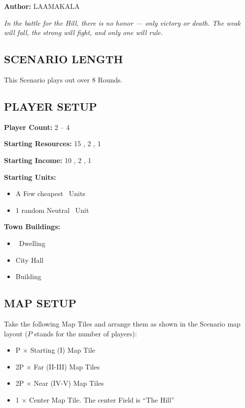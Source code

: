 
\begin{multicols*}{2}

\textbf{Author:} LAAMAKALA

\textit{In the battle for the Hill, there is no honor — only victory or death. The weak will fall, the strong will fight, and only one will rule.}

\subsection*{\MakeUppercase{Scenario Length}}
This Scenario plays out over 8 Rounds.

\subsection*{\MakeUppercase{Player Setup}}
\textbf{Player Count:} 2 -- 4

\textbf{Starting Resources:} 15 , 2 , 1 

\textbf{Starting Income:} 10 , 2 , 1 

\textbf{Starting Units:}
\begin{itemize}
  \item A Few cheapest \silver\ Units
  \item 1 random Neutral \bronze\ Unit
\end{itemize}

\textbf{Town Buildings:}
\begin{itemize}
  \item \bronze\ Dwelling
  \item City Hall
  \item {} Building
\end{itemize}

\subsection*{\MakeUppercase{Map Setup}}
Take the following Map Tiles and arrange them as shown in the Scenario map layout ($P$ stands for the number of players):

\begin{itemize}
  \item P × Starting (I) Map Tile
  \item 2P × Far (II-III) Map Tiles
  \item 2P × Near (IV-V) Map Tiles
  \item 1 × Center Map Tile. The center Field is ``The Hill''
\end{itemize}


\end{multicols*}
